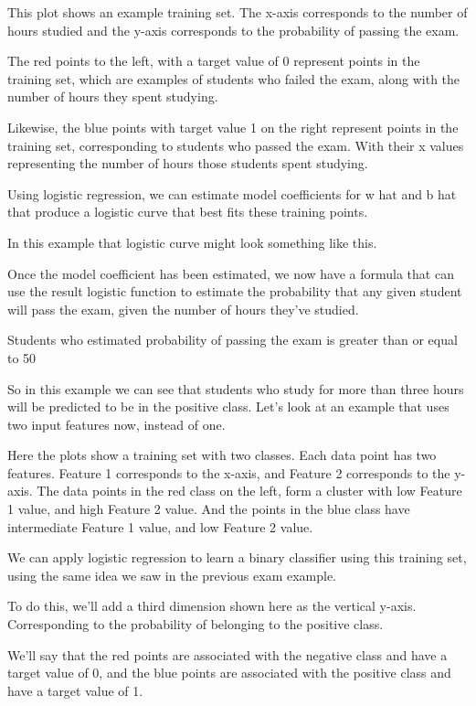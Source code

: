 \begin{multicols}{2}
This plot shows an example training set. The x-axis corresponds to the number of hours studied and the y-axis corresponds to the probability of passing the exam. 

The red points to the left, with a target value of 0 represent points in the training set, which are examples of students who failed the exam, along with the number of hours they spent studying. 

Likewise, the blue points with target value 1 on the right represent points in the training set, corresponding to students who passed the exam. With their x values representing the number of hours those students spent studying. 

Using logistic regression, we can estimate model coefficients for w hat and b hat that produce a logistic curve that best fits these training points. 

In this example that logistic curve might look something like this. 

Once the model coefficient has been estimated, we now have a formula that can use the result logistic function to estimate the probability that any given student will pass the exam, given the number of hours they've studied. 

Students who estimated probability of passing the exam is greater than or equal to 50%

So in this example we can see that students who study for more than three hours will be predicted to be in the positive class. Let's look at an example that uses two input features now, instead of one. 

Here the plots show a training set with two classes. Each data point has two features. Feature 1 corresponds to the x-axis, and Feature 2 corresponds to the y-axis. The data points in the red class on the left, form a cluster with low Feature 1 value, and high Feature 2 value. And the points in the blue class have intermediate Feature 1 value, and low Feature 2 value. 

We can apply logistic regression to learn a binary classifier using this training set, using the same idea we saw in the previous exam example. 

To do this, we'll add a third dimension shown here as the vertical y-axis. Corresponding to the probability of belonging to the positive class. 

We'll say that the red points are associated with the negative class and have a target value of 0, and the blue points are associated with the positive class and have a target value of 1. 


\end{multicols}

